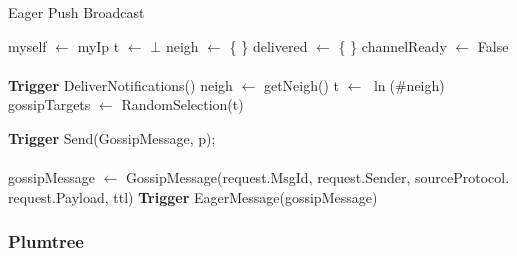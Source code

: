 \begin{algorithm}
   \caption{Eager Push Broadcast}
    \begin{algorithmic}[1]
        \State myself $\leftarrow$ myIp
        \State t $\leftarrow$ $\bot$
        \State neigh $\leftarrow$ \{ \}
        \State delivered $\leftarrow$ \{ \}
        \State channelReady $\leftarrow$ False
	  \EndFunction
    \paragraph{}
    
         \State \textbf{Trigger }DeliverNotifications()
          \State neigh $\leftarrow$ getNeigh()
          \State t $\leftarrow$ $\ln$(\#neigh)
                gossipTargets $\leftarrow$ RandomSelection(t)
                
                    \State \textbf{Trigger} Send(GossipMessage, p);
                    \EndFor
            \EndIf
        \EndIf
        \EndIf
\EndFunction

\paragraph{}

        \State gossipMessage $\leftarrow$ GossipMessage(request.MsgId, request.Sender, sourceProtocol. request.Payload, ttl)
        \State \textbf{Trigger} EagerMessage(gossipMessage)
        \EndIf
\EndFunction
	  
\end{algorithmic}
\end{algorithm}

\subsubsection{Plumtree}


